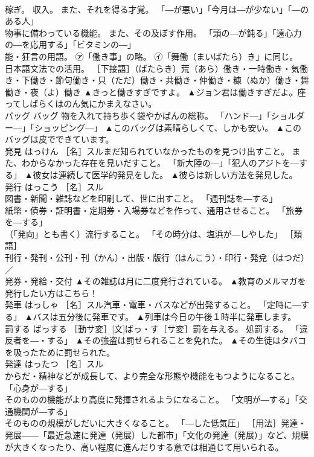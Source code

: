 \documentclass[8pt]{extreport}
\begin{document}
\begin{CJK}{UTF8}{min}
\\	稼ぎ。 収入。 また、それを得る才覚。 「―が悪い」「今月は―が少ない」「―のある人」 
\\	物事に備わっている機能。 また、その及ぼす作用。 「頭の―が鈍る」「遠心力の―を応用する」「ビタミンの―」 
\\	能・狂言の用語。 ㋐「働き事」の略。 ㋑「舞働（まいばたら）き」に同じ。 
\\	日本語文法での活用。 ［下接語］（ばたらき）荒（あら）働き・一時働き・気働き・下働き・節句働き・只（ただ）働き・共働き・仲働き・糠（ぬか）働き・舞働き・夜（よ）働き	▲きっと働きすぎですよ。 ▲ジョン君は働きすぎだよ。座ってしばらくはのん気にかまえなさい。
\\	バッグ	バッグ	物を入れて持ち歩く袋やかばんの総称。 「ハンド―」「ショルダー―」「ショッピング―」	▲このバッグは素晴らしくて、しかも安い。 ▲このバッグは皮でできています。
\\	発見	はっけん	［名］スルまだ知られていなかったものを見つけ出すこと。 また、わからなかった存在を見いだすこと。 「新大陸の―」「犯人のアジトを―する」	▲彼女は連続して医学的発見をした。 ▲彼らは新しい方法を発見した。
\\	発行	はっこう	［名］スル 
\\	図書・新聞・雑誌などを印刷して、世に出すこと。 「週刊誌を―する」 
\\	紙幣・債券・証明書・定期券・入場券などを作って、通用させること。 「旅券を―する」 
\\	（「発向」とも書く）流行すること。 「その時分は、塩浜が―しやした」 ［類語］
\\	刊行・発刊・公刊・刊（かん）・出版・版行（はんこう）・印行・発兌（はつだ）／
\\	発券・発給・交付	▲その雑誌は月に二度発行されている。 ▲教育のメルマガを発行したい方はこちら！
\\	発車	はっしゃ	［名］スル汽車・電車・バスなどが出発すること。 「定時に―する」	▲バスは五分後に発車です。 ▲列車は今日の午後１時半に発車します。
\\	罰する	ばっする	［動サ変］[文]ばっ・す［サ変］罰を与える。 処罰する。 「違反者を―・する」	▲その強盗は罰せられることを免れた。 ▲その生徒はタバコを吸ったために罰せられた。
\\	発達	はったつ	［名］スル 
\\	からだ・精神などが成長して、より完全な形態や機能をもつようになること。 「心身が―する」 
\\	そのものの機能がより高度に発揮されるようになること。 「文明が―する」「交通機関が―する」 
\\	そのものの規模がしだいに大きくなること。 「―した低気圧」 ［用法］発達・発展――「最近急速に発達（発展）した都市」「文化の発達（発展）」など、規模が大きくなったり、高い程度に進んだりする意では相通じて用いられる。 

\end{CJK}
\end{document}
